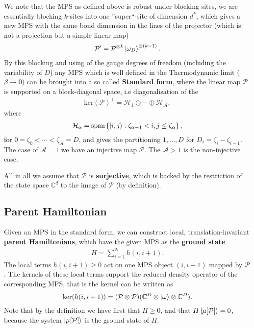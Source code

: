 We note that the MPS as defined above is robust under blocking sites, we are
essentially blocking $k$-sites into one ''super``-site of dimension $d^k$,
which gives a new MPS with the same bond dimension in the lines of the
projector (which is not a projection but a simple linear map)
\begin{align}
    \mathcal{P}' = \mathcal{P}^{\otimes k} \ket{\omega_D}^{\otimes (k-1)}.
\end{align}
By this blocking and using of the gauge degrees of freedom (including the
variability of $D$) any MPS which is well defined in the Thermodynamic limit
($\beta \rightarrow 0$) can be brought into a so called \textbf{Standard
form}, where the linear map $\mathcal{P}$ is supported on a block-diagonal
space, i.e diagonalisation of the
\begin{align}
    \text{ker}(\mathcal{P})^{\perp} =
    \mathcal{H}_1 \oplus \cdots \oplus \mathcal{H}_{\mathcal{A}},
\end{align}
where
\begin{align}
    \mathcal{H}_\alpha = \text{span}\left\{ \ket{i, j}: \zeta_{\alpha- 1}<
    i,j \le \zeta_\alpha \right\},
\end{align}
for $0 = \zeta_0 < \cdots < \zeta_\mathcal{A} = D$, and gives the
partitioning $1, \ldots, D$ for $D_i = \zeta_i - \zeta_{i-1}$. The case of
$\mathcal{A}=1$ we have an injective map $\mathcal{P}$. The $\mathcal{A} >1$
is the non-injective case.

All in all we assume that $\mathcal{P}$ is \textbf{surjective}, which is
backed by the restriction of the state space $\mathbb{C}^{d}$ to the image of
$\mathcal{P}$ (by definition).
\subsection{Parent Hamiltonian}
Given an MPS in the standard form, we can construct local,
translation-invariant \textbf{parent Hamiltonians}, which have the given MPS
as the \textbf{ground state}
\begin{align}\label{eq: hamiltonian}
   H = \sum_{i=1}^{N} h(i,i+1).
\end{align}
The local terms $h(i, i+1) \ge 0$ act on one MPS object $(i, i+1)$ mapped by
$\mathcal{P}$. The kernels of these local terms support the reduced density
operator of the corresponding MPS, that is the kernel can be written as
\begin{align}
    \text{ker}(h(i,i+1)) = (\mathcal{P} \otimes
    \mathcal{P})(\mathbb{C}^{D}\otimes \ket{\omega} \otimes \mathbb{C}^{D}).
\end{align}
Note that by the definition we have first that $H \ge 0$, and that
$H\ket{\mu[\mathcal{P}]} = 0$, because the system $\ket{\mu[\mathcal{P}]}$ is
the ground state of $H$.
\newline

